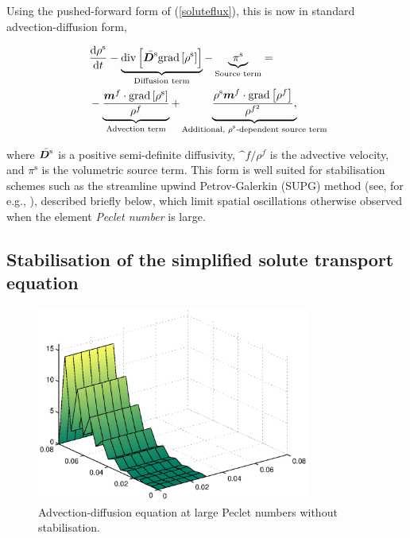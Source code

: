 \noindent Using the pushed-forward form of (\ref{soluteflux}), this is
now in standard advection-diffusion form, 

\begin{equation}
\begin{split}
& \frac{\mathrm{d}\rho^\mathrm{s}}{\mathrm{d}t} - \underbrace{
 \mathrm{div}\left[\bar{\mbox{\boldmath$ D$}^\mathrm{s}} \mathrm{grad}
 \left[ \rho^\mathrm{s}\right]\right]}_\text{Diffusion term}
 - \underbrace{\pi^\mathrm{s}}_\text{Source term} =
\\ \ & - \underbrace{\frac{\mbox{\boldmath$ m$}^f\cdot\mathrm{grad}\left[\rho^\mathrm{s}\right]}{\rho^f}}
_\text{Advection term} +
\underbrace{ \frac{\rho^\mathrm{s} \mbox{\boldmath$ m$}^f \cdot \mathrm{grad}\left[\rho^f\right]}
     {\rho^{f^2}},}_\text{Additional, $\rho^\mathrm{s}$-dependent source term}
\end{split}
\label{morestdform}
\end{equation}

\noindent where $\bar{\mbox{\boldmath$ D$}^\mathrm{s}}$ is a positive semi-definite
diffusivity, $\bm^{f}/\rho^{f}$ is the advective velocity, and $
\pi^\mathrm{s}$ is the volumetric source term. This form is well
suited for stabilisation schemes such as the streamline upwind
Petrov-Galerkin (SUPG) method (see, for e.g., \cite{Paper6}), described
briefly below, which limit spatial oscillations otherwise observed
when the element {\em Peclet number} is large.

\subsection{Stabilisation of the simplified solute transport equation}
\label{stabilisation-solute-transport}

\begin{figure}
\centering
\includegraphics[width=0.8\textwidth]
                {images/elucidation/unstable-advection.eps}
\caption{Advection-diffusion equation at large Peclet numbers without
  stabilisation.}
\label{ustable-solution}
\end{figure}

